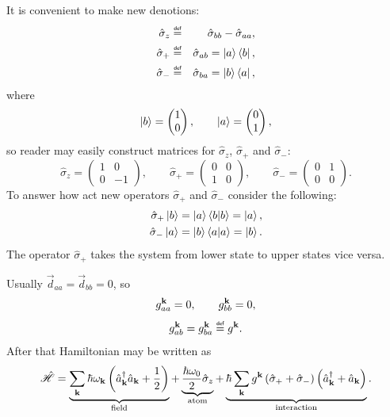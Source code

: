 It is convenient to make new denotions:
\begin{eqnarray}
	\hat{\sigma}_{z} &\myeq& \hat{\sigma}_{bb} - \hat{\sigma}_{aa}, \\
	\hat{\sigma}_{+} &\myeq& \hat{\sigma}_{ab} = \ket{a} \bra{b}, \\
	\hat{\sigma}_{-} &\myeq& \hat{\sigma}_{ba} = \ket{b} \bra{a},
\end{eqnarray}
where
\begin{equation}
	\left\lvert {b} \right\rangle = \begin{pmatrix}
		1 \\ 0
	\end{pmatrix}, \qquad
	\left\lvert {a} \right\rangle = \begin{pmatrix}
	0 \\ 1
	\end{pmatrix},
\end{equation}
so reader may easily construct matrices for $\hat{\sigma}_{z}$, $\hat{\sigma}_{+}$ and $\hat{\sigma}_{-}$:
\begin{equation}
	\hat{\sigma}_z = \begin{pmatrix}
	1 & 0 \\ 0 & -1
	\end{pmatrix}, \qquad
	\hat{\sigma}_+ = \begin{pmatrix}
	0 & 0 \\ 1 & 0
	\end{pmatrix}, \qquad
	\hat{\sigma}_- = \begin{pmatrix}
	0 & 1 \\ 0 & 0
	\end{pmatrix}.
\end{equation}
To answer how act new operators $\hat{\sigma}_{+}$ and $\hat{\sigma}_{-}$ consider the following:
\begin{eqnarray}
	\hat{\sigma}_{+} \left\lvert {b} \right\rangle = \left\lvert {a} \right\rangle \langle {b} \lvert {b} \rangle = \left\lvert {a} \right\rangle, \\
	\hat{\sigma}_{-} \left\lvert {a} \right\rangle = \left\lvert {b} \right\rangle \langle {a} \lvert {a} \rangle = \left\lvert {b} \right\rangle.
\end{eqnarray}
The operator $\hat{\sigma}_{+}$ takes the system from lower state to upper states vice versa.

Usually $\vec{d}_{aa} = \vec{d}_{bb} = 0$, so
\begin{equation}
	g^{\mathbf{k}}_{aa} = 0, \qquad g^{\mathbf{k}}_{bb} = 0,
\end{equation}
\begin{equation}
	g^{\kv}_{ab} = g^{\kv}_{ba} \myeq g^{\kv}.
\end{equation}
After that Hamiltonian may be written as
\begin{equation}
	\hat{\mathscr{H}} = \underbrace{\sum_{\mathbf{k}} \hbar \omega_{\mathbf{k}} \left( \hat{a}_{\mathbf{k}}^{\dagger}\hat{a}_{\mathbf{k}} + \frac{1}{2} \right)}_{\text{field}} + \underbrace{\frac{\hbar \omega_0}{2} \hat{\sigma}_z}_{\text{atom}} + \underbrace{\hbar \sum_{\mathbf{k}} g^{\mathbf{k}} \left( \hat{\sigma}_+ + \hat{\sigma}_- \right) \left( \hat{a}^{\dagger}_{\mathbf{k}} + \hat{a}_{\mathbf{k}} \right)}_{\text{interaction}}.
\end{equation}

